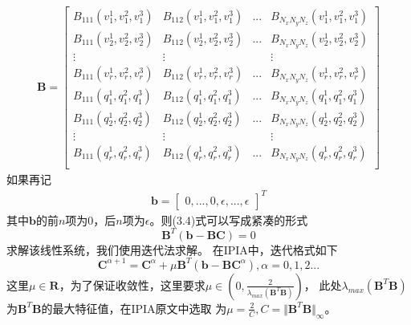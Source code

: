 \begin{align*}
    \mathbf{B} = \begin{bmatrix}
        B_{111}(v_1^1,v_1^2,v_1^3) & B_{112}(v_1^1,v_1^2,v_1^3) &...& B_{N_xN_yN_z}(v_1^1,v_1^2,v_1^3)\\
        B_{111}(v_2^1,v_2^2,v_2^3) & B_{112}(v_2^1,v_2^2,v_2^3) &...& B_{N_xN_yN_z}(v_2^1,v_2^2,v_2^3)\\
         \vdots & \vdots & & \vdots\\
        B_{111}(v_r^1,v_r^2,v_r^3) & B_{112}(v_r^1,v_r^2,v_r^3) &...& B_{N_xN_yN_z}(v_r^1,v_r^2,v_r^3)\\
        B_{111}(q_1^1,q_1^2,q_1^3) & B_{112}(q_1^1,q_1^2,q_1^3) &...& B_{N_xN_yN_z}(q_1^1,q_1^2,q_1^3)\\
        B_{111}(q_2^1,q_2^2,q_2^3) & B_{112}(q_2^1,q_2^2,q_2^3) &...& B_{N_xN_yN_z}(q_2^1,q_2^2,q_2^3)\\
        \vdots & \vdots & & \vdots\\
        B_{111}(q_r^1,q_r^2,q_r^3) & B_{112}(q_r^1,q_r^2,q_r^3) &...& B_{N_xN_yN_z}(q_r^1,q_r^2,q_r^3)\\
    \end{bmatrix}
\end{align*}
如果再记
\begin{align*}
    \mathbf{b} = \begin{bmatrix}0,...,0,\epsilon,...,\epsilon\end{bmatrix}^T
\end{align*}
其中$\mathbf{b}$的前$n$项为$0$，后$n$项为$\epsilon$。则(3.4)式可以写成紧凑的形式
\begin{equation}
    \mathbf{B}^T ( \mathbf{b} - \mathbf{B} \mathbf{C}) = 0    
\end{equation}
求解该线性系统，我们使用迭代法求解。
在IPIA中，迭代格式如下
\begin{equation}
    \mathbf{C}^{\alpha + 1} = \mathbf{C}^{\alpha} + \mu \mathbf{B}^T(\mathbf{b} - \mathbf{B}\mathbf{C}^{\alpha}) , \alpha = 0,1,2...
\end{equation}
这里$\mu \in \mathbf{R}$，为了保证收敛性，这里要求$\mu\in (0,\frac{2}{\lambda_{max}(\mathbf{B}^T\mathbf{B})})$，
此处$\lambda_{max}(\mathbf{B}^T\mathbf{B})$为$\mathbf{B}^T\mathbf{B}$的最大特征值，在IPIA原文中选取
为$\mu = \frac{2}{C}, C = {\Vert \mathbf{B}^T\mathbf{B} \Vert}_{\infty}$。

